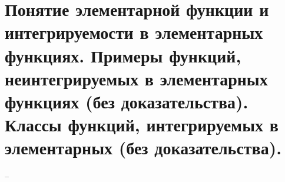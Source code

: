 \section{Понятие элементарной функции и интегрируемости в элементарных функциях. Примеры функций, неинтегрируемых в элементарных функциях (без доказательства). Классы функций, интегрируемых в элементарных (без доказательства).}
--
\newline